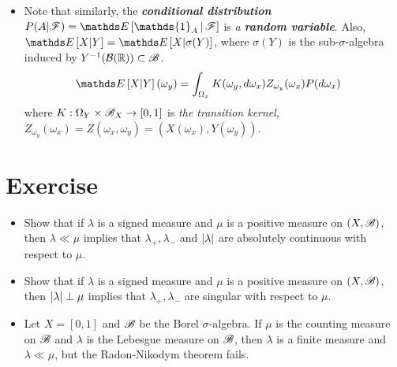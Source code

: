 \documentclass[11pt]{article}
\begin{document}
\begin{itemize}
\begin{proof}
To show the claim is true, we see that $\nu(E)= \mu(E)$ and $\rlat{\lambda}{\srF}(E)= \lambda(E)$ for every $E\in \srF$ and $\lambda \ll \mu$, so for any $\epsilon>0$, there exists $\delta>0$, such that if $\mu(E)<\delta$, then $\lambda(E)<\epsilon$. It is equivalent to say $\nu(E)<\delta$ implies $\rlat{\lambda}{\srF}(E)<\epsilon$, which proves the claim. \qed
\end{proof}

\item \begin{remark}
Note that similarly, the \emph{\textbf{conditional distribution}} $P(A| \srF)= \E{}{\mathds{1}_{A}\,|\, \srF}$ is \emph{a \textbf{random variable}}.  Also, $\E{}{X| Y}= \E{}{X| \sigma(Y)}$, where $\sigma(Y)$ is the sub-$\sigma$-algebra induced by  $Y^{-1}({\mathcal B}({\mathbb R}))\subset {\mathscr B}$.
\begin{align*}
\E{}{X| Y}(\omega_{y}) &= \int_{\Omega_{x}}K(\omega_{y}, d\omega_{x})Z_{\omega_{y}}(\omega_{x})P(d\omega_{x})
\end{align*}
where $K: \Omega_{Y} \times {\mathscr B}_{X} \rightarrow [0,1]$ is \emph{the transition kernel}, $Z_{\omega_{y}}(\omega_{x})= Z(\omega_{x}, \omega_{y})= (X(\omega_{x}), Y(\omega_{y}))$.
\end{remark}
\end{itemize}
\newpage
\section{Exercise}
\begin{itemize}
\item \begin{exercise}
Show that if $\lambda$ is a signed measure and $\mu$ is a positive measure on $(X, {\mathscr B})$, then $\lambda \ll \mu$  implies that $\lambda_{+}, \lambda_{-}$ and $\left\lvert \lambda \right\rvert$ are absolutely continuous with respect to $\mu$.
\end{exercise}

\item \begin{exercise}
Show that if $\lambda$ is a signed measure and $\mu$ is a positive measure on $(X, {\mathscr B})$, then $\left\lvert \lambda \right\rvert \perp \mu$  implies that $\lambda_{+}, \lambda_{-}$ are singular with respect to $\mu$. 
\end{exercise}

\item \begin{exercise}
Let $X= [0,1]$ and ${\mathscr B}$ be the Borel $\sigma$-algebra. If $\mu$ is the counting measure on ${\mathscr B}$ and $\lambda$ is the Lebesgue measure on ${\mathscr B}$, then $\lambda$ is a finite measure and $\lambda \ll \mu$, but the Radon-Nikodym theorem fails. 
\end{exercise}

\end{itemize}

\newpage


\end{document}
